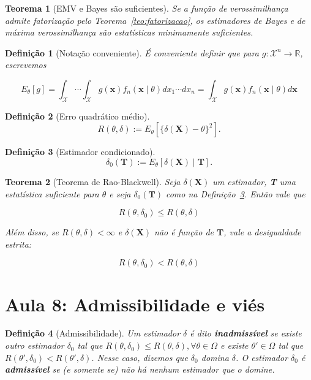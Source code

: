 \documentclass{article}
\newtheorem{theorem}{Teorema}
\newtheorem{definition}{Definição}
\begin{document}
	\begin{theorem}[EMV e Bayes são suficientes]
		Se a função de verossimilhança admite fatorização pelo Teorema~\ref{teo:fatorizacao}, os estimadores de Bayes e de máxima verossimilhança são estatísticas minimamente suficientes.
	\end{theorem}
	
	\begin{definition}[Notação conveniente]
		É conveniente definir que para $g : \mathcal{X}^n \rightarrow \mathbb{R}$, escrevemos
		
		\begin{equation}
			E_\theta [g] = \int_\mathcal{X} \cdots \int_\mathcal{X} g(\textbf{x}) f_n (\textbf{x} \mid \theta) d x_1 \cdots d x_n = \int_\mathcal{X} g(\textbf{x}) f_n (\textbf{x} \mid \theta) d \textbf{x} 
		\end{equation}
	\end{definition}
	
	\begin{definition}[Erro quadrático médio]
		\begin{equation}
			R(\theta, \delta) := E_\theta \left [ \{ \delta(\textbf{X}) - \theta \}^2 \right ].
		\end{equation}
	\end{definition}
	
	\begin{definition}[Estimador condicionado]\label{def:est. cond.}
		\begin{equation}
			\delta_0 (\textbf{T}) := E_\theta \left [ \delta(\textbf{X}) \mid \textbf{T} \right ].
		\end{equation}
	\end{definition}
	
	\begin{theorem}[Teorema de Rao-Blackwell]
		Seja $\delta(\textbf{X})$ um estimador, \textbf{T} uma estatística suficiente para $\theta$ e seja $\delta_0(\textbf{T})$ como na Definição~\ref{def:est. cond.}. Então vale que
		
		$$R(\theta, \delta_0) \leq R(\theta, \delta)$$
		
		Além disso, se $R(\theta, \delta) < \infty$ e $\delta (\textbf{X})$ não é função de $\textbf{T}$, vale a desigualdade estrita:
		
		$$R(\theta, \delta_0) < R(\theta, \delta)$$
	\end{theorem}
	
	\section*{Aula 8: Admissibilidade e viés}
	\label{s8}
	\begin{definition}[Admissibilidade]
		Um estimador $\delta$ é dito \textbf{inadmissível} se existe outro estimador $\delta_0$ tal que $R(\theta, \delta_0) \leq R(\theta, \delta), \forall \theta \in \Omega$ e existe $\theta' \in \Omega$ tal que $R(\theta', \delta_0) < R(\theta', \delta)$. Nesse caso, dizemos que $\delta_0$ domina $\delta$. O estimador $\delta_0$ é \textbf{admissível} se (e somente se) não há nenhum estimador que o domine.
	\end{definition}
	
\end{document}
